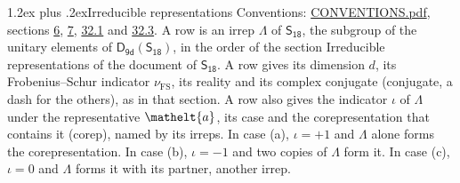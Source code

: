 \documentclass[10pt,a4paper]{article}
\makeatletter
\renewcommand\section{\@startsection{section}{1}{\z@}{-3ex plus -1ex minus -.2ex}%
  {1.2ex plus .2ex}{\normalfont\large\sffamily\bfseries\color{parttitle}}}
\numberwithin{equation}{section}
\newcommand{\eltfont}[1]{{\let\sigma\eltsigma\mathelt{#1}}}
\newcommand{\grp}[1]{\mathsf{#1}}
\newcommand{\elt}[1]{\eltfont{#1}}
\newcommand{\fsind}{\nu_{\mathrm{FS}}}
\makeatother
\begin{document}
\section{Irreducible representations}\label{s:irreps}
Conventions: \href{../../CONVENTIONS.pdf}{CONVENTIONS.pdf}, sections \href{../../../rotation/CONVENTIONS.pdf\#conv.6}{6}, \href{../../../rotation/CONVENTIONS.pdf\#conv.7}{7}, \href{../../CONVENTIONS.pdf\#conv.32.1}{32.1} and \href{../../CONVENTIONS.pdf\#conv.32.3}{32.3}.
\leavevmode\label{n:irrep.Delta}A row is an irrep $\Lambda$ of $\grp{S_{18}}$, the subgroup of the unitary elements of $\grp{D_{9d}}(\grp{S_{18}})$, in the order of the section Irreducible representations of the document of \href{../../../rotation/data/pdf/S18.pdf}{$\grp{S_{18}}$}. \label{n:index.dimension}\label{n:index.frobenius}\label{n:head.irrep}\label{n:head.reality}\label{n:head.conjugate}A row gives its dimension $d$, its Frobenius--Schur indicator $\fsind$, its reality and its complex conjugate (conjugate, a dash for the others), as in that section. \label{n:head.case.corep}\label{n:head.corep}A row also gives the indicator $\iota$ of $\Lambda$ under the representative $\elt{a}$, its case and the corepresentation that contains it (corep), named by its irreps. In case (a), $\iota = +1$ and $\Lambda$ alone forms the corepresentation. In case (b), $\iota = -1$ and two copies of $\Lambda$ form it. In case (c), $\iota = 0$ and $\Lambda$ forms it with its partner, another irrep.
\setlength{\emergencystretch}{2em}\par\setlength{\emergencystretch}{0pt}
\end{document}
